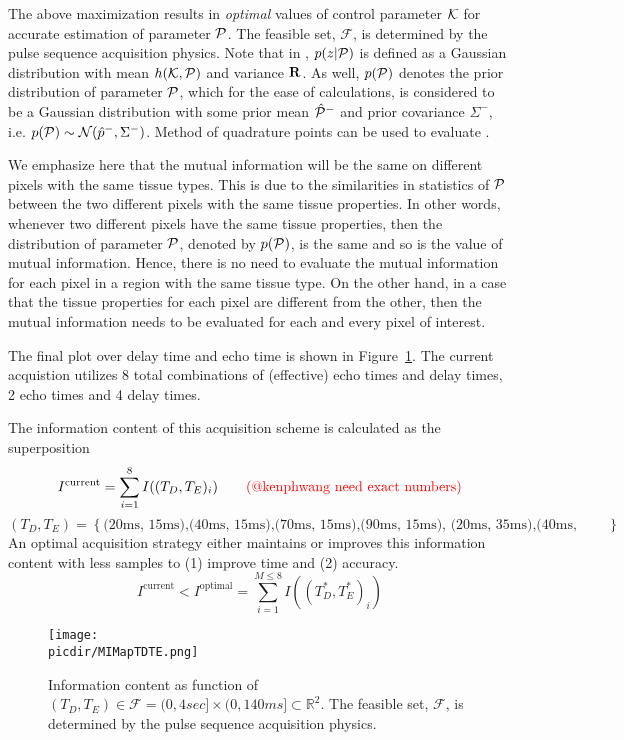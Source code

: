 \documentclass{article}         %
\theoremstyle{definition}
\theoremstyle{remark}
\newcommand{\picdir}{pdffig/}
\begin{document}
The above maximization results in \textit{optimal} values of control parameter
$\mathcal{K}$ for accurate estimation of parameter $\mathcal{P}$. 
The feasible set, $\mathcal{F}$, is determined by the pulse sequence acquisition physics.
Note that in ,
$p(z|\mathcal{P})$ is defined as a Gaussian distribution with mean $h(\mathcal{K},\mathcal{P})$ and
variance $\mathbf{R}$. As well, $p(\mathcal{P})$ denotes the prior distribution of parameter
$\mathcal{P}$, which for the ease of calculations, is considered to be a Gaussian
distribution with some prior mean $\hat{\mathcal{P}}^-$ and prior covariance $\Sigma^-$,
i.e. $p(\mathcal{P})\sim \mathcal{N}(\hat{p}^-,\Sigma^-)$. Method of quadrature points
can be used to evaluate . 

We emphasize here that the mutual information will be the same on different pixels with the same tissue types. This is due to the similarities in statistics of $\mathcal{P}$ between the two different pixels with the same tissue properties. In other words, whenever two different pixels have the same tissue properties, then the distribution of parameter $\mathcal{P}$, denoted by $p(\mathcal{P})$, is the same and so is the value of mutual information. Hence, there is no need to evaluate the mutual information for each pixel in a region with the same tissue type. 
On the other hand, in a case that the tissue properties for each pixel are different from the other, then the mutual information needs to be evaluated for each and every pixel of interest.

The final plot over delay time and echo time is shown in Figure~\ref{fig:MIMapTDTE}.
The current acquistion utilizes 8 total combinations of (effective) echo times 
and delay times, 2 echo times and 4 delay times.

The information content of this acquisition scheme is calculated as the superposition
\[
 I^\text{current} = \sum_{i=1}^8 I((T_D, T_E)_i)
\qquad \text{\color{red}(@kenphwang need exact numbers)}
\]
\[
   \left(T_D, T_E\right) = 
   \left\{
   \text{(20ms, 15ms),(40ms, 15ms),(70ms, 15ms),(90ms, 15ms),
         (20ms, 35ms),(40ms, 35ms),(70ms, 35ms),(90ms, 35ms)}
   \right\}
\]
An optimal acquisition strategy either maintains or improves this information content with
less samples to (1) improve time and (2) accuracy.
\[
  I^\text{current} < I^\text{optimal} = \sum_{i=1}^{M \leq 8} I((T^*_D, T^*_E)_i)
\]

\begin{figure}[h] 
\centering
\texttt{[image: \\picdir/MIMapTDTE.png]} 
\caption{ 
Information content as function of $(T_D, T_E) \in \mathcal{F} = (0,4sec] \times (0,140ms] \subset \mathbb{R}^2 $.
The feasible set, $\mathcal{F} $, 
is determined by the pulse sequence acquisition physics.
}\label{fig:MIMapTDTE}
\end{figure}
\end{document}
